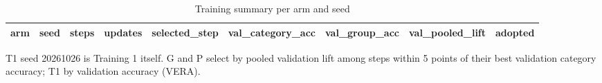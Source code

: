\begin{table}[htbp]
\centering
\scriptsize
\caption{Training summary per arm and seed}\label{tab:R3}
\begin{adjustbox}{max width=\textwidth}
\begin{tabular}{llrrrrrrr}
\toprule
arm & seed & steps & updates & selected\_\allowbreak{}step & val\_\allowbreak{}category\_\allowbreak{}acc & val\_\allowbreak{}group\_\allowbreak{}acc & val\_\allowbreak{}pooled\_\allowbreak{}lift & adopted \\
\midrule

\bottomrule
\end{tabular}
\end{adjustbox}
\par\smallskip\parbox{\textwidth}{\footnotesize T1 seed 20261026 is Training 1 itself. G and P select by pooled validation lift among steps within 5 points of their best validation category accuracy; T1 by validation accuracy (VERA).}
\end{table}
